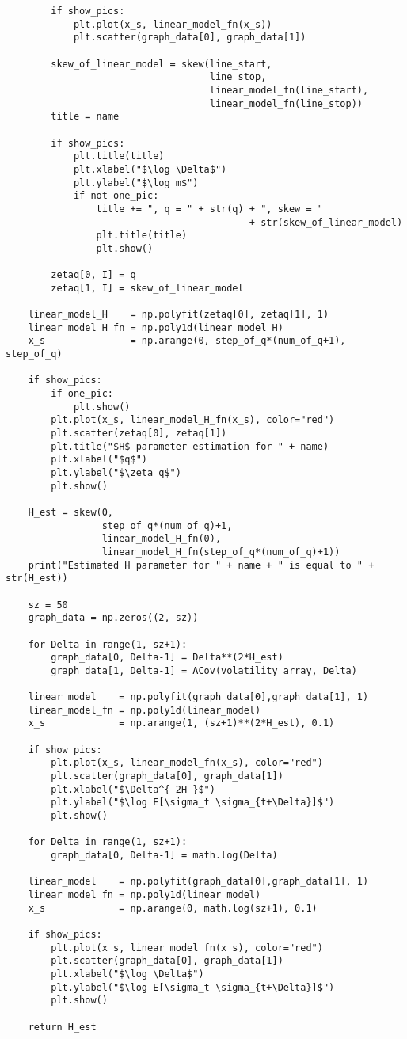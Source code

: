 \begin{verbatim}
        if show_pics:
            plt.plot(x_s, linear_model_fn(x_s))
            plt.scatter(graph_data[0], graph_data[1])

        skew_of_linear_model = skew(line_start, 
                                    line_stop, 
                                    linear_model_fn(line_start), 
                                    linear_model_fn(line_stop))
        title = name

        if show_pics:
            plt.title(title)
            plt.xlabel("$\log \Delta$")
            plt.ylabel("$\log m$")
            if not one_pic:
                title += ", q = " + str(q) + ", skew = " 
                                           + str(skew_of_linear_model)
                plt.title(title)
                plt.show()

        zetaq[0, I] = q
        zetaq[1, I] = skew_of_linear_model

    linear_model_H    = np.polyfit(zetaq[0], zetaq[1], 1)
    linear_model_H_fn = np.poly1d(linear_model_H)
    x_s               = np.arange(0, step_of_q*(num_of_q+1), step_of_q)

    if show_pics:
        if one_pic:
            plt.show()
        plt.plot(x_s, linear_model_H_fn(x_s), color="red")
        plt.scatter(zetaq[0], zetaq[1])
        plt.title("$H$ parameter estimation for " + name)
        plt.xlabel("$q$")
        plt.ylabel("$\zeta_q$")
        plt.show()

    H_est = skew(0, 
                 step_of_q*(num_of_q)+1, 
                 linear_model_H_fn(0), 
                 linear_model_H_fn(step_of_q*(num_of_q)+1))
    print("Estimated H parameter for " + name + " is equal to " + str(H_est))

    sz = 50
    graph_data = np.zeros((2, sz))

    for Delta in range(1, sz+1):
        graph_data[0, Delta-1] = Delta**(2*H_est)
        graph_data[1, Delta-1] = ACov(volatility_array, Delta)

    linear_model    = np.polyfit(graph_data[0],graph_data[1], 1)
    linear_model_fn = np.poly1d(linear_model)
    x_s             = np.arange(1, (sz+1)**(2*H_est), 0.1)

    if show_pics:
        plt.plot(x_s, linear_model_fn(x_s), color="red")
        plt.scatter(graph_data[0], graph_data[1])
        plt.xlabel("$\Delta^{ 2H }$")
        plt.ylabel("$\log E[\sigma_t \sigma_{t+\Delta}]$")
        plt.show()

    for Delta in range(1, sz+1):
        graph_data[0, Delta-1] = math.log(Delta)

    linear_model    = np.polyfit(graph_data[0],graph_data[1], 1)
    linear_model_fn = np.poly1d(linear_model)
    x_s             = np.arange(0, math.log(sz+1), 0.1)

    if show_pics:
        plt.plot(x_s, linear_model_fn(x_s), color="red")
        plt.scatter(graph_data[0], graph_data[1])
        plt.xlabel("$\log \Delta$")
        plt.ylabel("$\log E[\sigma_t \sigma_{t+\Delta}]$")
        plt.show()

    return H_est
    \end{verbatim}  